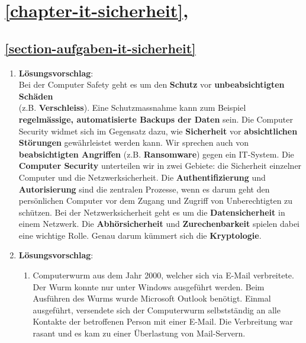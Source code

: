 
\section{\autoref{chapter-it-sicherheit}, }

\subsection*{\ref{section-aufgaben-it-sicherheit} }

\begin{enumerate}

\item \textbf{Lösungsvorschlag}:\\

Bei der Computer Safety geht es um den \textbf{Schutz} vor \textbf{unbeabsichtigten Schäden} \\  (z.B. \textbf{Verschleiss}). Eine Schutzmassnahme kann zum Beispiel \textbf{regelmässige, automatisierte Backups der Daten} sein. Die Computer Security widmet sich im Gegensatz dazu, wie \textbf{Sicherheit} vor \textbf{absichtlichen Störungen} gewährleistet werden kann. Wir sprechen auch von \textbf{beabsichtigten Angriffen} (z.B. \textbf{Ransomware}) gegen ein \ac{IT}-System. Die \textbf{Computer Security} unterteilen wir in zwei Gebiete: die Sicherheit einzelner Computer und die Netzwerksicherheit. Die \textbf{Authentifizierung} und \textbf{Autorisierung} sind die zentralen Prozesse, wenn es darum geht den persönlichen Computer vor dem Zugang und Zugriff von Unberechtigten zu schützen. Bei der Netzwerksicherheit geht es um die \textbf{Datensicherheit} in einem Netzwerk. Die \textbf{Abhörsicherheit} und \textbf{Zurechenbarkeit} spielen dabei eine wichtige Rolle. Genau darum kümmert sich die \textbf{Kryptologie}.\\

\item \textbf{Lösungsvorschlag}:

\begin{enumerate}
\item Computerwurm aus dem Jahr 2000, welcher sich via E-Mail verbreitete. Der Wurm konnte nur unter Windows ausgeführt werden. Beim Ausführen des Wurms wurde Microsoft Outlook benötigt. Einmal ausgeführt, versendete sich der Computerwurm selbstständig an alle Kontakte der betroffenen Person mit einer E-Mail. Die Verbreitung war rasant und es kam zu einer Überlastung von Mail-Servern.


\end{enumerate}
\end{enumerate}
